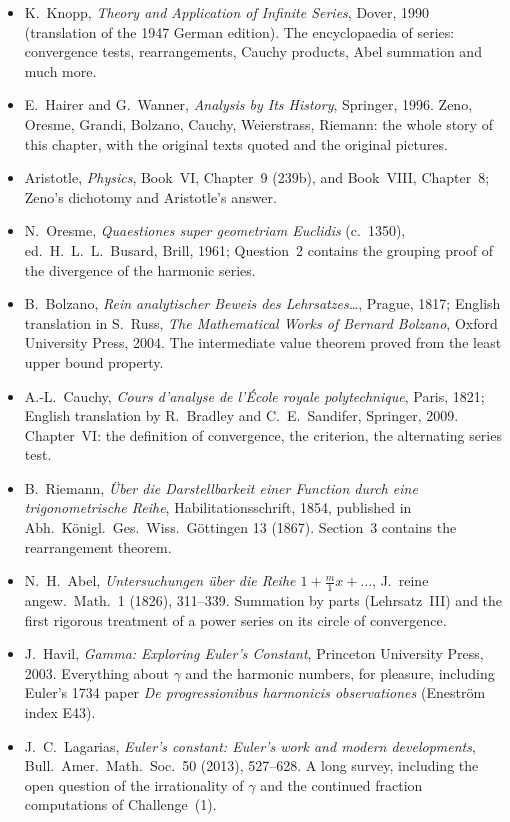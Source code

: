 \begin{itemize}
\item K.~Knopp, \emph{Theory and Application of Infinite Series}, Dover, 1990 (translation of the 1947 German edition). The encyclopaedia of series: convergence tests, rearrangements, Cauchy products, Abel summation and much more.
\item E.~Hairer and G.~Wanner, \emph{Analysis by Its History}, Springer, 1996. Zeno, Oresme, Grandi, Bolzano, Cauchy, Weierstrass, Riemann: the whole story of this chapter, with the original texts quoted and the original pictures.
\item Aristotle, \emph{Physics}, Book~VI, Chapter~9 (239b), and Book~VIII, Chapter~8; Zeno's dichotomy and Aristotle's answer.
\item N.~Oresme, \emph{Quaestiones super geometriam Euclidis} (c.~1350), ed.\ H.~L.~L.~Busard, Brill, 1961; Question~2 contains the grouping proof of the divergence of the harmonic series.
\item B.~Bolzano, \emph{Rein analytischer Beweis des Lehrsatzes\dots}, Prague, 1817; English translation in S.~Russ, \emph{The Mathematical Works of Bernard Bolzano}, Oxford University Press, 2004. The intermediate value theorem proved from the least upper bound property.
\item A.-L.~Cauchy, \emph{Cours d'analyse de l'\'Ecole royale polytechnique}, Paris, 1821; English translation by R.~Bradley and C.~E.~Sandifer, Springer, 2009. Chapter~VI: the definition of convergence, the criterion, the alternating series test.
\item B.~Riemann, \emph{\"Uber die Darstellbarkeit einer Function durch eine trigonometrische Reihe}, Habilitationsschrift, 1854, published in Abh.\ K\"onigl.\ Ges.\ Wiss.\ G\"ottingen 13 (1867). Section~3 contains the rearrangement theorem.
\item N.~H.~Abel, \emph{Untersuchungen \"uber die Reihe $1+\frac m1x+\dots$}, J.\ reine angew.\ Math.\ 1 (1826), 311--339. Summation by parts (Lehrsatz~III) and the first rigorous treatment of a power series on its circle of convergence.
\item J.~Havil, \emph{Gamma: Exploring Euler's Constant}, Princeton University Press, 2003. Everything about $\gamma$ and the harmonic numbers, for pleasure, including Euler's 1734 paper \emph{De progressionibus harmonicis observationes} (Eneström index E43).
\item J.~C.~Lagarias, \emph{Euler's constant: Euler's work and modern developments}, Bull.\ Amer.\ Math.\ Soc.\ 50 (2013), 527--628. A long survey, including the open question of the irrationality of $\gamma$ and the continued fraction computations of Challenge~(1).

\end{itemize}

